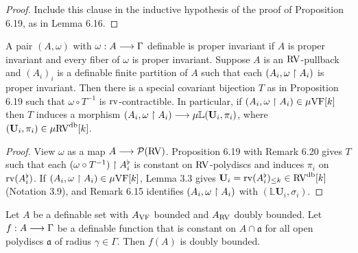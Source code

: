 \begin{proof}
\leanok
Include this clause in the inductive hypothesis of the proof of Proposition 6.19, as in Lemma 6.16.
\end{proof}

\setcounter{theorem}{20}
\begin{lemma}
\label{L-measure-surjective}
\leanok
{}
A pair $(A,\omega)$ with $\omega:A\longrightarrow\Gamma$ definable is proper invariant if $A$ is proper invariant and every fiber of $\omega$ is proper invariant. Suppose $A$ is an $\mathrm{RV}$-pullback and $(A_i)_i$ is a definable finite partition of $A$ such that each $(A_i,\omega\upharpoonright A_i)$ is proper invariant. Then there is a special covariant bijection $T$ as in Proposition 6.19 such that $\omega\circ T^{-1}$ is $\operatorname{rv}$-contractible. In particular, if $(A_i,\omega\upharpoonright A_i)\in\mu\mathrm{VF}[k]$ then $T$ induces a morphism $(A_i,\omega\upharpoonright A_i)\longrightarrow\mu\mathbb{L}(\mathbf{U}_i,\pi_i)$, where $(\mathbf{U}_i,\pi_i)\in\mu\mathrm{RV}^{\operatorname{db}}[k]$.
\end{lemma}

\begin{proof}
\leanok
View $\omega$ as a map $A\longrightarrow\mathcal{P}(\mathrm{RV})$. Proposition 6.19 with Remark 6.20 gives $T$ such that each $(\omega\circ T^{-1})\upharpoonright A_i^\flat$ is constant on $\mathrm{RV}$-polydiscs and induces $\pi_i$ on $\operatorname{rv}(A_i^\flat)$. If $(A_i,\omega\upharpoonright A_i)\in\mu\mathrm{VF}[k]$, Lemma 3.3 gives $\mathbf{U}_i=\operatorname{rv}(A_i^\flat)_{\leq k}\in\mathrm{RV}^{\operatorname{db}}[k]$ (Notation 3.9), and Remark 6.15 identifies $(A_i,\omega\upharpoonright A_i)$ with $(\mathbb{L}\mathbf{U}_i,\sigma_i)$.
\end{proof}

\setcounter{theorem}{21}
\begin{lemma}
\label{invar-db}
\leanok
{}
Let $A$ be a definable set with $A_{\mathrm{VF}}$ bounded and $A_{\mathrm{RV}}$ doubly bounded. Let $f:A\longrightarrow\Gamma$ be a definable function that is constant on $A\cap\mathfrak{a}$ for all open polydiscs $\mathfrak{a}$ of radius $\gamma\in\Gamma$. Then $f(A)$ is doubly bounded.
\end{lemma}

